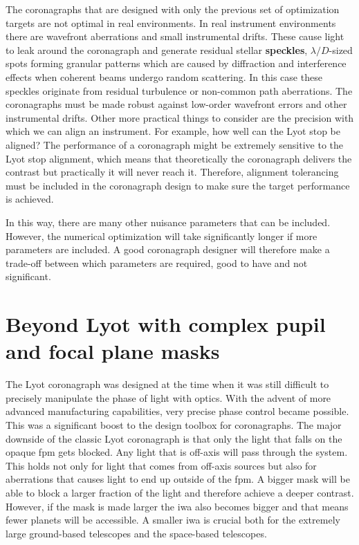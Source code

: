 \documentclass[letterpaper]{ar-1col}
\begin{document}
The coronagraphs that are designed with only the previous set of optimization targets are not optimal in real environments.
%
In real instrument environments there are wavefront aberrations and small instrumental drifts.
%
These cause light to leak around the coronagraph and generate residual stellar {\bf speckles}, $\lambda/D$-sized spots forming granular patterns which are caused by diffraction and interference effects when coherent beams undergo random scattering.
%
In this case these speckles originate from residual turbulence or non-common path aberrations.
%
The coronagraphs must be made robust against low-order wavefront errors and other instrumental drifts.
%
Other more practical things to consider are the precision with which we can align an instrument.
%
For example, how well can the Lyot stop be aligned?
%
The performance of a coronagraph might be extremely sensitive to the Lyot stop alignment, which means that theoretically the coronagraph delivers the contrast but practically it will never reach it.
%
Therefore, alignment tolerancing must be included in the coronagraph design to make sure the target performance is achieved.

In this way, there are many other nuisance parameters that can be included.
%
However, the numerical optimization will take significantly longer if more parameters are included.
%
A good coronagraph designer will therefore make a trade-off between which parameters are required, good to have and not significant.

\section{Beyond Lyot with complex pupil and focal plane masks}

The Lyot coronagraph was designed at the time when it was still difficult to precisely manipulate the phase of light with optics.
%
With the advent of more advanced manufacturing capabilities, very precise phase control became possible.
%
This was a significant boost to the design toolbox for coronagraphs.
%
The major downside of the classic Lyot coronagraph is that only the light that falls on the opaque \ac{fpm} gets blocked.
%
Any light that is off-axis will pass through the system.
%
This holds not only for light that comes from off-axis sources but also for aberrations that causes light to end up outside of the \ac{fpm}.
%
A bigger mask will be able to block a larger fraction of the light and therefore achieve a deeper contrast.
%
However, if the mask is made larger the \ac{iwa} also becomes bigger and that means fewer planets will be accessible.
%
A smaller \ac{iwa} is crucial both for the extremely large ground-based telescopes and the space-based telescopes. 
\end{document}
